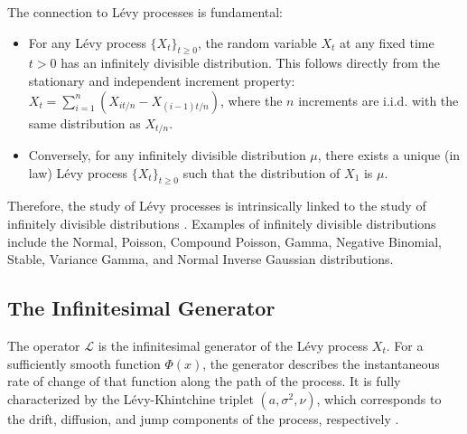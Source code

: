 \documentclass[11pt,twoside,openright]{report}
\begin{document}
The connection to Lévy processes is fundamental:
\begin{itemize}
    \item For any Lévy process $\{X_t\}_{t \ge 0}$, the random variable $X_t$ at any fixed time $t > 0$ has an infinitely divisible distribution. This follows directly from the stationary and independent increment property: $X_t = \sum_{i=1}^n (X_{it/n} - X_{(i-1)t/n})$, where the $n$ increments are i.i.d. with the same distribution as $X_{t/n}$.
    \item Conversely, for any infinitely divisible distribution $\mu$, there exists a unique (in law) Lévy process $\{X_t\}_{t \ge 0}$ such that the distribution of $X_1$ is $\mu$.
\end{itemize}
Therefore, the study of Lévy processes is intrinsically linked to the study of infinitely divisible distributions \cite{sato1999levy}. Examples of infinitely divisible distributions include the Normal, Poisson, Compound Poisson, Gamma, Negative Binomial, Stable, Variance Gamma, and Normal Inverse Gaussian distributions.

\subsection{The Infinitesimal Generator}
\label{subsec:generator}

The operator $\mathcal{L}$ is the infinitesimal generator of the Lévy process $X_t$. For a sufficiently smooth function $\Phi(x)$, the generator describes the instantaneous rate of change of that function along the path of the process. It is fully characterized by the Lévy-Khintchine triplet $(a, \sigma^2, \nu)$, which corresponds to the drift, diffusion, and jump components of the process, respectively \cite{carr2003stochastic}.
\end{document}
